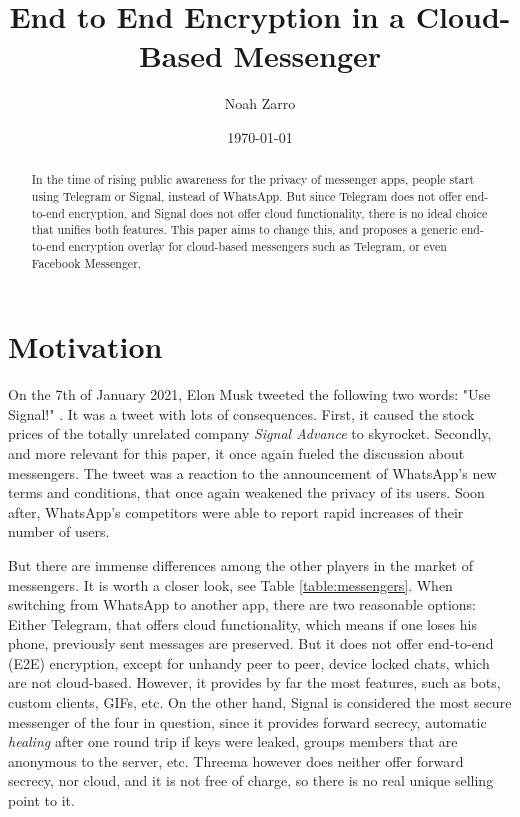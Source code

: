 \documentclass[a4paper, oneside]{discothesis}
\title{End to End Encryption in a Cloud-Based Messenger}
\author{Noah Zarro}
\institute{Distributed Computing Group \\[2pt]
Computer Engineering and Networks Laboratory \\[2pt]
ETH Zürich}
\date{\today}
\begin{document}
\frontmatter %
\maketitle

\cleardoublepage

\begin{abstract}

In the time of rising public awareness for the privacy of messenger apps, people start using Telegram or Signal, instead of WhatsApp. But since Telegram does not offer end-to-end encryption, and Signal does not offer cloud functionality, there is no ideal choice that unifies both features. This paper aims to change this, and proposes a generic end-to-end encryption overlay for cloud-based messengers such as Telegram, or even Facebook Messenger.

\end{abstract}

\tableofcontents

\mainmatter %


\chapter{Motivation}
On the 7th of January 2021, Elon Musk tweeted the following two words: "Use Signal!" \cite{Twitter}. It was a tweet with lots of consequences. First, it caused the stock prices of the totally unrelated company \emph{Signal Advance} to skyrocket. Secondly, and more relevant for this paper, it once again fueled the discussion about messengers. The tweet was a reaction to the announcement of WhatsApp's new terms and conditions, that once again weakened the privacy of its users. Soon after, WhatsApp's competitors were able to report rapid increases of their number of users.

But there are immense differences among the other players in the market of messengers. It is worth a closer look, see Table \ref{table:messengers}. When switching from WhatsApp to another app, there are two reasonable options: Either Telegram, that offers cloud functionality, which means if one loses his phone, previously sent messages are preserved. But it does not offer end-to-end (E2E) encryption, except for unhandy peer to peer, device locked chats, which are not cloud-based. However, it provides by far the most features, such as bots, custom clients, GIFs, etc. On the other hand, Signal is considered the most secure messenger of the four in question, since it provides forward secrecy, automatic \emph{healing} after one round trip if keys were leaked, groups members that are anonymous to the server, etc. Threema however does neither offer forward secrecy, nor cloud, and it is not free of charge, so there is no real unique selling point to it.
\end{document}
